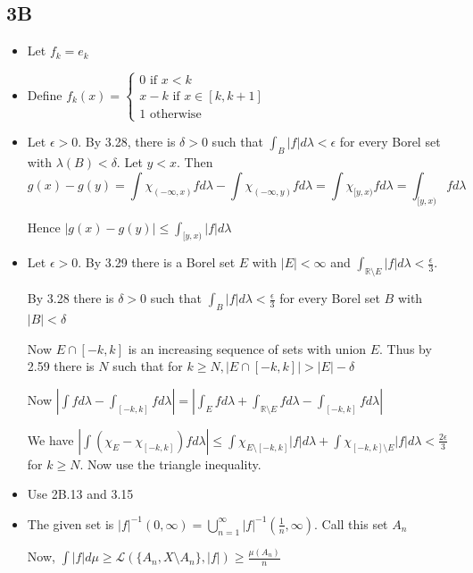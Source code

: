 \documentclass{article}
\begin{document}
\subsection*{3B}
\begin{itemize}
    \item [1] Let $f_k=e_k$
    \item[2] Define $f_k(x)=\begin{cases}
        0 \text{ if } x<k \\
        x-k \text{ if } x \in [k,k+1]\\
        1 \text{ otherwise}
    \end{cases}$
    
    \item [3] Let $\epsilon > 0$. By 3.28, there is $\delta > 0$ such that $\int_B |f|d\lambda<\epsilon $ for every Borel set with $\lambda(B)<\delta$. Let $y<x$. 
    Then \[g(x)-g(y)=\int \chi_{(-\infty,x)}fd\lambda - \int \chi_{(-\infty,y)}fd\lambda=\int \chi_{[y,x)}f d\lambda=\int_{[y,x)}f d\lambda\]

    Hence $|g(x)-g(y)|\leq \int_{[y,x)}|f|d\lambda$

    \item[5] Let $\epsilon>0$. By 3.29 there is a Borel set $E$ with $|E|<\infty$ and $\int_{\mathbb{R}\setminus E}|f|d\lambda<\frac{\epsilon}{3}$. 
    
    By 3.28 there is $\delta > 0$ such that $\int_{B} |f|d\lambda< \frac{\epsilon}{3}$ for every Borel set $B$ with $|B|<\delta$
    
    Now $E \cap [-k,k]$ is an increasing sequence of sets with union $E$. Thus by 2.59 there is $N$ such that for $k \geq N, |E\cap[-k,k]|>|E|-\delta$

    Now $|\int fd\lambda-\int_{[-k,k]}f d\lambda|=|\int_E fd\lambda+\int_{\mathbb{R}\setminus E}f d\lambda-\int_{[-k,k]}f d\lambda|$

    We have $|\int (\chi_E-\chi_{[-k,k]})fd\lambda|\leq \int \chi_{E\setminus[-k,k]}|f|d\lambda+\int\chi_{[-k,k]\setminus E}|f|d\lambda<\frac{2\epsilon}{3}$ for $k \geq N$. Now use the triangle inequality.

    \item[9] Use 2B.13 and 3.15

    \item[11] The given set is $|f|^{-1}(0,\infty)=\bigcup_{n=1}^\infty|f|^{-1}(\frac{1}{n},\infty)$. Call this set $A_n$
    
    Now, $\int|f|d\mu\geq \mathcal{L}(\{A_n,X \setminus A_n\},|f|)\geq \frac{\mu(A_n)}{n}$

    
\end{itemize}
\end{document}
